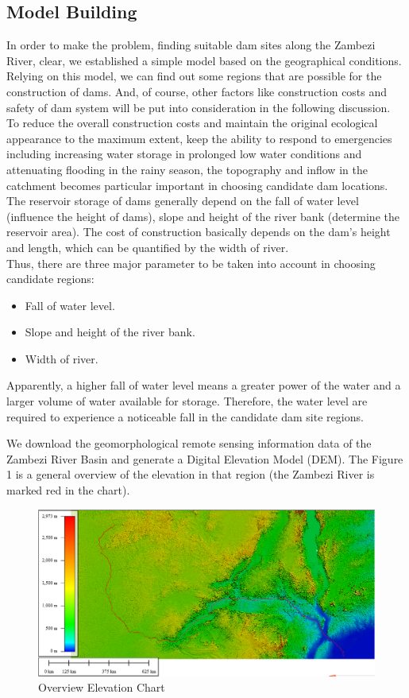 \documentclass{mcmthesis}
\begin{document}
\subsection{Model Building}
\indent \indent In order to make the problem, finding suitable dam sites along the Zambezi River, clear, we established a simple model based on the geographical conditions. Relying on this model, we can find out some regions that are possible for the construction of dams. And, of course, other factors like construction costs and safety of dam system will be put into consideration in the following discussion.\\
\indent To reduce the overall construction costs and maintain the original ecological appearance to the maximum extent, keep the ability to respond to emergencies including increasing water storage in prolonged low water conditions and attenuating flooding in the rainy season, the topography and inflow in the catchment becomes particular important in choosing candidate dam locations.\\
\indent The reservoir storage of dams generally depend on the fall of water level (influence the height of dams), slope and height of the river bank (determine the reservoir area). The cost of construction basically depends on the dam’s height and length, which can be quantified by the width of river.\\ 
\indent Thus, there are three major parameter to be taken into account in choosing candidate regions:
\begin{itemize}
\item Fall of water level.
\item Slope and height of the river bank.
\item Width of river.
\end{itemize}

Apparently, a higher fall of water level means a greater power of the water and a larger volume of water available for storage. Therefore, the water level are required to experience a noticeable fall in the candidate dam site regions. 

We download the geomorphological remote sensing information data of the Zambezi River Basin and generate a Digital Elevation Model (DEM). The Figure 1 is a general overview of the elevation in that region (the Zambezi River is marked red in the chart).

\begin{figure}[h]
\small
\centering
\includegraphics[width=14cm]{./figures/Sensing_Figure.png}
\caption{Overview Elevation Chart} \label{fig:Fig1}
\end{figure}
\end{document}

